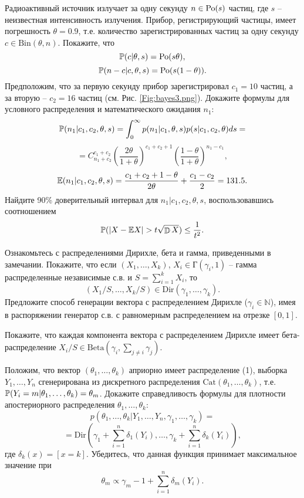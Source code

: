 \begin{problem}
Радиоактивный источник излучает за одну секунду $n \in \mathrm{Po}(s)$ частиц, где $s$ -- неизвестная интенсивность излучения. Прибор, регистрирующий частицы, имеет погрешность $\theta = 0.9$, т.е. количество зарегистрированных частиц за одну секунду $c \in \mathrm{Bin}(\theta,n)$. Покажите, что 
\[
\mathrm{{\mathbb P}}(c|\theta,s) = \mathrm{Po}(s\theta),
\]
\[
\mathrm{{\mathbb P}}(n-c|c,\theta,s) = \mathrm{Po}(s(1-\theta)). 
\]
Предположим, что за первую секунду прибор зарегистрировал $c_1 = 10$ частиц, а за вторую -- $c_2 = 16$ частиц (см. Рис. \ref{Fig:bayes3.png}). Докажите формулы для условного распределения и математического ожидания $n_1$: 
\[
\mathrm{{\mathbb P}}(n_1 | c_1, c_2, \theta, s) = \int_{0}^{\infty} p(n_1|c_1,\theta,s) p(s|c_1,c_2,\theta) ds = 
\]
\[
= C_{n_1+c_2}^{c_1+c_2} \left(\frac{2\theta}{1+\theta}\right)^{c_1+c_2+1} \left(\frac{1-\theta}{1+\theta}\right)^{n_1 - c_1},  
\]
\[
\mathrm{{\mathbb E}}(n_1 | c_1, c_2, \theta, s) = \frac{c_1 + c_2 + 1 - \theta}{2\theta} + \frac{c_1 - c_2}{2} = 131.5.
\]
Найдите 90\% доверительный интервал для $n_1 | c_1, c_2, \theta, s$, воспользовавшись соотношением
\[
\mathrm{{\mathbb P}}(|X - \mathrm{{\mathbb E}} X| > t \sqrt{\mathop{\mathbb{D}}\nolimits X}) \leq \frac{1}{t^2}.
\]
\end{problem}


\begin{problem}
\label{dir}

Ознакомьтесь с распределениями Дирихле, бета и гамма, приведенными в замечании. Покажите, что если $(X_1, \ldots, X_k)$, $X_i \in \text{Г}( \gamma_i, 1)$ -- гамма распределенные независимые с.в. и $S = \sum \limits_{i=1}^k X_i$, то 
\[\tag{1}
(X_1 / S , \ldots, X_k / S) \in \mathrm{Dir}(\gamma_1, \ldots, \gamma_{k}).
\] 
Предложите способ генерации вектора с распределением Дирихле ($\gamma_i \in \mathbb{N}$), имея в распоряжении генератор с.в. с равномерным распределением на отрезке $[0, 1]$. 

Покажите, что каждая компонента вектора с распределением Дирихле имеет бета-распределение $X_i/S \in \mathrm{Beta}(\gamma_i, \sum \limits_{j \neq i} \gamma_j)$. 

Положим, что вектор $(\theta_1,\ldots,\theta_k)$ априорно имеет распределение (1), выборка $Y_1,\ldots, Y_n$ сгенерирована из дискретного распределения $\mathrm{Cat}(\theta_1,\ldots,\theta_k)$, т.е. $\mathrm{{\mathbb P}}(Y_i = m | \theta_1,\ldots,\theta_k) = \theta_m$. Докажите справедливость формулы для плотности апостериорного распределения $\theta_1,\ldots,\theta_k$: 
\[
p(\theta_1,\ldots,\theta_k \vert Y_1,\ldots, Y_n, \gamma_1, \ldots, \gamma_{k}) = 
\]
\[
=\mathrm{Dir}\left(\gamma_1 + \sum_{i=1}^n \delta_1(Y_i), \ldots, \gamma_{k}+ \sum_{i=1}^n \delta_k(Y_i)\right),
\]
где $\delta_k(x) = [x = k]$.
Убедитесь, что данная функция принимает максимальное значение при 
\[\tag{2}
\theta_m \propto \gamma_m - 1 + \sum_{i=1}^n \delta_m(Y_i).
\]

\end{problem}


